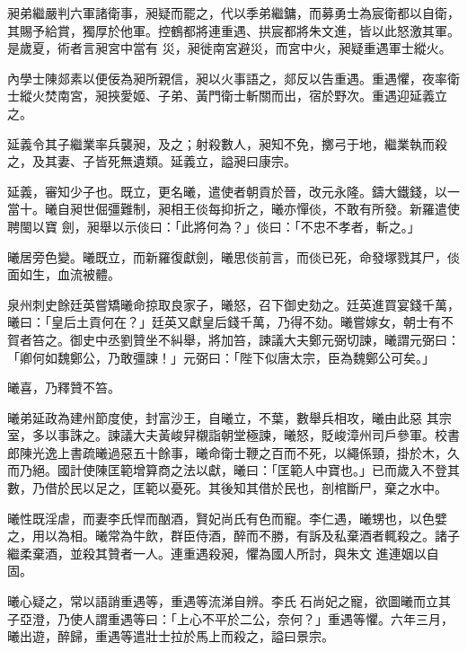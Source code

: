 \begin{pinyinscope}
 昶弟繼嚴判六軍諸衛事，昶疑而罷之，代以季弟繼鏞，而募勇士為宸衛都以自衛，其賜予給賞，獨厚於他軍。控鶴都將連重遇、拱宸都將朱文進，皆以此怒激其軍。是歲夏，術者言昶宮中當有
 災，昶徙南宮避災，而宮中火，昶疑重遇軍士縱火。



 內學士陳郯素以便佞為昶所親信，昶以火事語之，郯反以告重遇。重遇懼，夜率衛士縱火焚南宮，昶挾愛姬、子弟、黃門衛士斬關而出，宿於野次。重遇迎延義立之。



 延義令其子繼業率兵襲昶，及之；射殺數人，昶知不免，擲弓于地，繼業執而殺之，及其妻、子皆死無遺類。延義立，謚昶曰康宗。



 延義，審知少子也。既立，更名曦，遣使者朝貢於晉，改元永隆。鑄大鐵錢，以一當十。曦自昶世倔彊難制，昶相王倓每抑折之，曦亦憚倓，不敢有所發。新羅遣使聘閩以寶
 劍，昶舉以示倓曰：「此將何為？」倓曰：「不忠不孝者，斬之。」



 曦居旁色變。曦既立，而新羅復獻劍，曦思倓前言，而倓已死，命發塚戮其尸，倓面如生，血流被體。



 泉州刺史餘廷英嘗矯曦命掠取良家子，曦怒，召下御史劾之。廷英進買宴錢千萬，曦曰：「皇后土貢何在？」廷英又獻皇后錢千萬，乃得不劾。曦嘗嫁女，朝士有不賀者笞之。御史中丞劉贊坐不糾舉，將加笞，諫議大夫鄭元弼切諫，曦謂元弼曰：「卿何如魏鄭公，乃敢彊諫！」元弼曰：「陛下似唐太宗，臣為魏鄭公可矣。」



 曦喜，乃釋贊不笞。



 曦弟延政為建州節度使，封富沙王，自曦立，不葉，數舉兵相攻，曦由此惡
 其宗室，多以事誅之。諫議大夫黃峻舁櫬詣朝堂極諫，曦怒，貶峻漳州司戶參軍。校書郎陳光逸上書疏曦過惡五十餘事，曦命衛士鞭之百而不死，以繩係頸，掛於木，久而乃絕。國計使陳匡範增算商之法以獻，曦曰：「匡範人中寶也。」已而歲入不登其數，乃借於民以足之，匡範以憂死。其後知其借於民也，剖棺斷尸，棄之水中。



 曦性既淫虐，而妻李氏悍而酗酒，賢妃尚氏有色而寵。李仁遇，曦甥也，以色嬖之，用以為相。曦常為牛飲，群臣侍酒，醉而不勝，有訴及私棄酒者輒殺之。諸子繼柔棄酒，並殺其贊者一人。連重遇殺昶，懼為國人所討，與朱文
 進連姻以自固。



 曦心疑之，常以語誚重遇等，重遇等流涕自辨。李氏石尚妃之寵，欲圖曦而立其子亞澄，乃使人謂重遇等曰：「上心不平於二公，奈何？」重遇等懼。六年三月，曦出遊，醉歸，重遇等遣壯士拉於馬上而殺之，謚曰景宗。




\end{pinyinscope}
